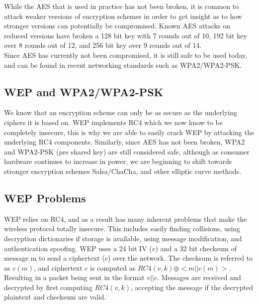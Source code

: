 \documentclass[10pt, titlepage]{article}
\begin{document}

While the AES that is used in practice has not been broken, it is common to attack weaker versions of encryption schemes in order to get insight as to how stronger versions can potentially be compromised. Known AES attacks on reduced versions have broken a 128 bit key with 7 rounds out of 10, 192 bit key over 8 rounds out of 12, and 256 bit key over 9 rounds out of 14. \\

Since AES has currently not been compromised, it is still safe to be used today, and can be found in recent networking standards such as WPA2/WPA2-PSK.

\subsection{WEP and WPA2/WPA2-PSK}
We know that an encryption scheme can only be as secure as the underlying ciphers it is based on. WEP implements RC4 which we now know to be completely insecure, this is why we are able to easily crack WEP by attacking the underlying RC4 components. Similarly, since AES has not been broken, WPA2 and WPA2-PSK (pre shared key) are still considered safe, although as consumer hardware continues to increase in power,  we are beginning to shift towards stronger encryption schemes Salsa/ChaCha, and other elliptic curve methods. \\

\subsection{WEP Problems}
WEP relies on RC4, and as a result has many inherent problems that make the wireless protocol totally insecure. This includes easily finding collisions, using decryption dictionaries if storage is available, using message modification,  and authentication spoofing. WEP uses a 24 bit IV ($v$) and a 32 bit checksum of message m to send a ciphertext ($c$) over the network. The checksum is referred to as $c(m)$, and ciphertext $c$ is computed as $RC4(v,k) \oplus <m || c(m)>$. Resulting in a packet being sent in the format $v || c$. Messages are received and decrypted by first computing $RC4(v,k)$, accepting the message if the decrypted plaintext and checksum are valid. \\
\end{document}
